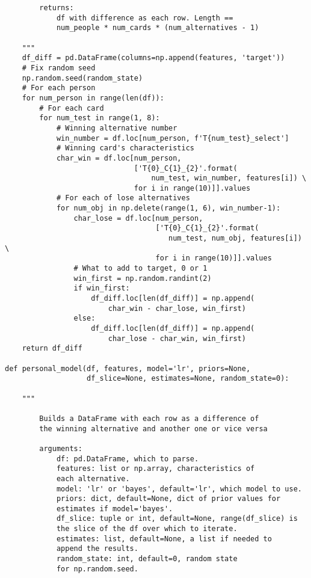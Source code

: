\documentclass[a4paper, 12pt]{extreport}
\begin{document}
\begin{verbatim}
        returns:
            df with difference as each row. Length ==
            num_people * num_cards * (num_alternatives - 1)

    """
    df_diff = pd.DataFrame(columns=np.append(features, 'target'))
    # Fix random seed
    np.random.seed(random_state)
    # For each person
    for num_person in range(len(df)):
        # For each card
        for num_test in range(1, 8):
            # Winning alternative number
            win_number = df.loc[num_person, f'T{num_test}_select']
            # Winning card's characteristics
            char_win = df.loc[num_person,
                              ['T{0}_C{1}_{2}'.format(
                                  num_test, win_number, features[i]) \
                              for i in range(10)]].values
            # For each of lose alternatives
            for num_obj in np.delete(range(1, 6), win_number-1):
                char_lose = df.loc[num_person,
                                   ['T{0}_C{1}_{2}'.format(
                                      num_test, num_obj, features[i]) \
                                   for i in range(10)]].values
                # What to add to target, 0 or 1
                win_first = np.random.randint(2)
                if win_first:
                    df_diff.loc[len(df_diff)] = np.append(
                        char_win - char_lose, win_first)
                else:
                    df_diff.loc[len(df_diff)] = np.append(
                        char_lose - char_win, win_first)
    return df_diff

def personal_model(df, features, model='lr', priors=None,
                   df_slice=None, estimates=None, random_state=0):

    """

        Builds a DataFrame with each row as a difference of
        the winning alternative and another one or vice versa

        arguments:
            df: pd.DataFrame, which to parse.
            features: list or np.array, characteristics of
            each alternative.
            model: 'lr' or 'bayes', default='lr', which model to use.
            priors: dict, default=None, dict of prior values for
            estimates if model='bayes'.
            df_slice: tuple or int, default=None, range(df_slice) is
            the slice of the df over which to iterate.
            estimates: list, default=None, a list if needed to
            append the results.
            random_state: int, default=0, random state
            for np.random.seed.


\end{verbatim}
\end{document}
